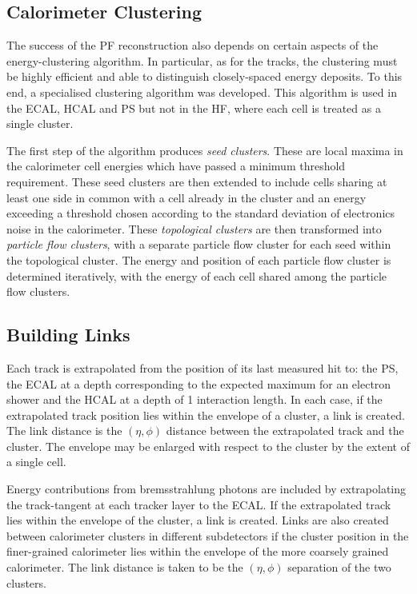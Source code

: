 \subsection{Calorimeter Clustering}
The success of the \ac{PF} reconstruction also depends on certain aspects of the
energy-clustering algorithm. In particular, as for the tracks, the clustering
must be highly efficient and able to distinguish closely-spaced energy deposits.
To this end, a specialised clustering algorithm was developed. This algorithm is
used in the \ac{ECAL}, \ac{HCAL} and \ac{PS} but not in the \ac{HF}, where each
cell is treated as a single cluster.

The first step of the algorithm produces \emph{seed clusters}. These are local
maxima in the calorimeter cell energies which have passed a minimum threshold
requirement.  These seed clusters are then extended to include cells sharing at
least one side in common with a cell already in the cluster and an energy exceeding a
threshold chosen according to the standard deviation of electronics noise in the
calorimeter. These \emph{topological clusters} are then transformed into
\emph{particle flow clusters}, with a separate particle flow cluster for each
seed within the topological cluster. The energy and position of each particle
flow cluster is determined iteratively, with the energy of each cell shared
among the particle flow clusters.

\subsection{Building Links}
Each track is extrapolated from the position of its last measured hit to: the
\ac{PS}, the \ac{ECAL} at a depth corresponding to the expected maximum for an
electron shower and the \ac{HCAL} at a depth of 1 interaction length. In each
case, if the extrapolated track position lies within the envelope of a cluster,
a link is created. The link distance is the $(\eta, \phi)$ distance between the
extrapolated track and the cluster. The envelope may be enlarged with respect to
the cluster by the extent of a single cell.

Energy contributions from bremsstrahlung photons are included by extrapolating
the track-tangent at each tracker layer to the \ac{ECAL}. If the extrapolated
track lies within the envelope of the cluster, a link is created.  Links are
also created between calorimeter clusters in different subdetectors if the
cluster position in the finer-grained calorimeter lies within the envelope of
the more coarsely grained calorimeter. The link distance is taken to be the
$(\eta, \phi)$ separation of the two clusters.

